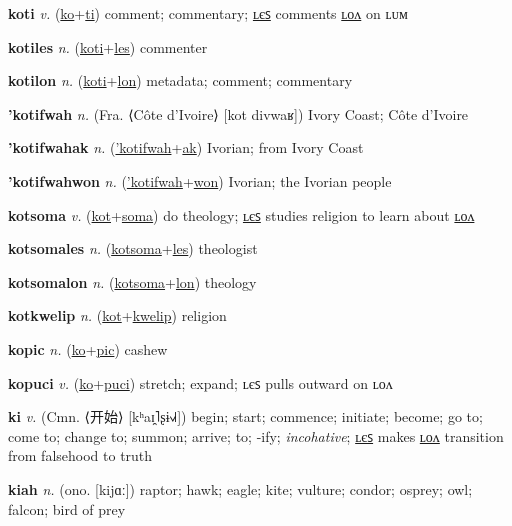 \textbf{\hypertarget{koti}{koti}} \textit{v.} (\hyperlink{ko}{ko}+\allowbreak \hyperlink{ti}{ti})
comment; commentary; \hyperlink{kotiles}{ʟєꜱ} comments \hyperlink{kotilon}{ʟᴏᴧ} on ʟᴜᴍ

\textbf{\hypertarget{kotiles}{kotiles}} \textit{n.} (\hyperlink{koti}{koti}+\allowbreak \hyperlink{les}{les})
commenter

\textbf{\hypertarget{kotilon}{kotilon}} \textit{n.} (\hyperlink{koti}{koti}+\allowbreak \hyperlink{lon}{lon})
metadata; comment; commentary

\textbf{\hypertarget{'kotifwah}{'kotifwah}} \textit{n.} (Fra. ⟨Côte d’Ivoire⟩ [kot divwaʁ])
Ivory Coast; Côte d’Ivoire

\textbf{\hypertarget{'kotifwahak}{'kotifwahak}} \textit{n.} (\hyperlink{'kotifwah}{'kotifwah}+\allowbreak \hyperlink{ak}{ak})
Ivorian; from Ivory Coast

\textbf{\hypertarget{'kotifwahwon}{'kotifwahwon}} \textit{n.} (\hyperlink{'kotifwah}{'kotifwah}+\allowbreak \hyperlink{won}{won})
Ivorian; the Ivorian people

\textbf{\hypertarget{kotsoma}{kotsoma}} \textit{v.} (\hyperlink{kot}{kot}+\allowbreak \hyperlink{soma}{soma})
do theology; \hyperlink{kotsomales}{ʟєꜱ} studies religion to learn about \hyperlink{kotsomalon}{ʟᴏᴧ}

\textbf{\hypertarget{kotsomales}{kotsomales}} \textit{n.} (\hyperlink{kotsoma}{kotsoma}+\allowbreak \hyperlink{les}{les})
theologist

\textbf{\hypertarget{kotsomalon}{kotsomalon}} \textit{n.} (\hyperlink{kotsoma}{kotsoma}+\allowbreak \hyperlink{lon}{lon})
theology

\textbf{\hypertarget{kotkwelip}{kotkwelip}} \textit{n.} (\hyperlink{kot}{kot}+\allowbreak \hyperlink{kwelip}{kwelip})
religion

\textbf{\hypertarget{kopic}{kopic}} \textit{n.} (\hyperlink{ko}{ko}+\allowbreak \hyperlink{pic}{pic})
cashew

\textbf{\hypertarget{kopuci}{kopuci}} \textit{v.} (\hyperlink{ko}{ko}+\allowbreak \hyperlink{puci}{puci})
stretch; expand; ʟєꜱ pulls outward on ʟᴏᴧ

\textbf{\hypertarget{ki}{ki}} \textit{v.} (Cmn. ⟨{\chinese{}开始}⟩ [kʰaɪ̯˥ʂɨ˧˩˧])
begin; start; commence; initiate; become; go to; come to; change to; summon; arrive; to; -ify; \textit{incohative}; \hyperlink{kiles}{ʟєꜱ} makes \hyperlink{kilon}{ʟᴏᴧ} transition from falsehood to truth

\textbf{\hypertarget{kiah}{kiah}} \textit{n.} (ono. [kijɑː])
raptor; hawk; eagle; kite; vulture; condor; osprey; owl; falcon; bird of prey

